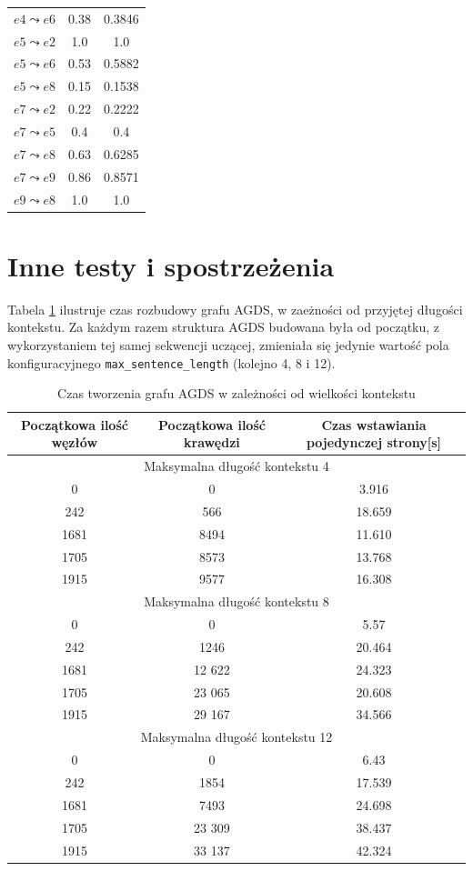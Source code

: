 \begin{table}[!h]
\begin{tabular}{ccc}
$e4 \leadsto e6$ & 0.38  & 0.3846\\
$e5 \leadsto e2$ & 1.0  & 1.0\\
$e5 \leadsto e6$ & 0.53 & 0.5882\\
$e5 \leadsto e8$ & 0.15  & 0.1538\\
$e7 \leadsto e2$ & 0.22  & 0.2222\\ 
$e7 \leadsto e5$ & 0.4  & 0.4\\
$e7 \leadsto e8$ & 0.63  & 0.6285\\
$e7 \leadsto e9$ & 0.86  & 0.8571\\
$e9 \leadsto e8$ & 1.0  & 1.0\\
\end{tabular}
\end{table}


\section{Inne testy i spostrzeżenia}
\label{sec:inneTesty}

Tabela \ref{tab:kontekstTest} ilustruje czas rozbudowy grafu AGDS, w zaeżności od przyjętej długości kontekstu.  Za każdym razem
struktura AGDS budowana była od początku, z wykorzystaniem tej samej sekwencji uczącej, zmieniała się jedynie wartość pola konfiguracyjnego
\texttt{max\_sentence\_length} (kolejno 4, 8 i 12).

\begin{table}[!h]
\centering
\caption{Czas tworzenia grafu AGDS w zależności od wielkości kontekstu}
\label{tab:kontekstTest}
\begin{tabular}{ccc}
\hline
Początkowa ilość węzłów  & Początkowa ilość krawędzi & Czas wstawiania pojedynczej strony[s]\\
\hline
\multicolumn{3}{c}{Maksymalna długość kontekstu 4}\\
\hline
0 & 0 & 3.916 \\
242 & 566 & 18.659 \\
1681 & 8494 & 11.610 \\
1705 & 8573 & 13.768 \\
1915 & 9577 & 16.308 \\
\hline
\multicolumn{3}{c}{Maksymalna długość kontekstu 8}\\
\hline
0 & 0 & 5.57\\
242 & 1246 & 20.464\\
1681 & 12 622 & 24.323\\
1705 & 23 065 & 20.608 \\
1915 & 29 167 & 34.566 \\
\hline
\multicolumn{3}{c}{Maksymalna długość kontekstu 12}\\
\hline
0 & 0 & 6.43 \\
242 & 1854 & 17.539 \\
1681 & 7493 & 24.698 \\
1705 & 23 309 & 38.437 \\
1915 & 33 137 & 42.324 \\
\hline
\end{tabular}
\end{table}

